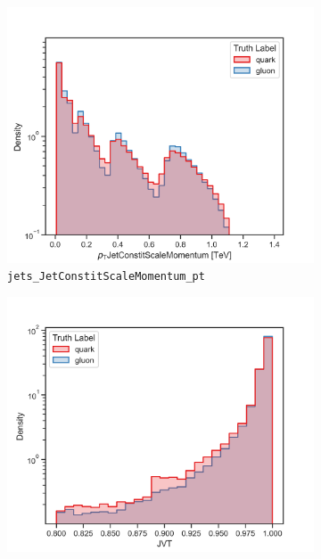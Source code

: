 \begin{figure}[!htb]
	\centering
	\begin{subfigure}[t]{0.48\textwidth}
		\includegraphics[width=1\textwidth]{src/plots/distributions/highlevel/jets_JetConstitScaleMomentum_pt.png}
		\caption{\texttt{jets\_JetConstitScaleMomentum\_pt}}
		\label{fig:highlevel_12}
	\end{subfigure}
	\begin{subfigure}[t]{0.48\textwidth}
		\includegraphics[width=1\textwidth]{src/plots/distributions/highlevel/jets_Jvt.png}

\end{subfigure}
\end{figure}
